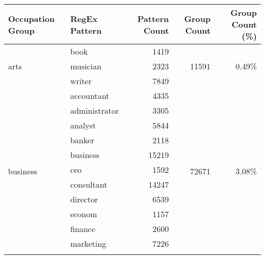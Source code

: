 \begin{table}[!htb]
\centering
\begin{tabular}{|l|l|r|r|r|}
\hline
Occupation Group                   & RegEx Pattern & Pattern Count   & Group Count            & Group Count (\%)       \\ \hline
\multirow{3}{*}{arts}      & book            & 1419    & \multirow{3}{*}{11591}  & \multirow{3}{*}{0.49\%}  \\ \cline{2-3}
                           & musician        & 2323    &                         &                          \\ \cline{2-3}
                           & writer          & 7849    &                         &                          \\ \hline
\multirow{12}{*}{business} & accountant      & 4335    & \multirow{12}{*}{72671} & \multirow{12}{*}{3.08\%} \\ \cline{2-3}
                           & administrator   & 3305    &                         &                          \\ \cline{2-3}
                           & analyst         & 5844    &                         &                          \\ \cline{2-3}
                           & banker          & 2118    &                         &                          \\ \cline{2-3}
                           & business        & 15219   &                         &                          \\ \cline{2-3}
                           & ceo             & 1592    &                         &                          \\ \cline{2-3}
                           & consultant      & 14247   &                         &                          \\ \cline{2-3}
                           & director        & 6539    &                         &                          \\ \cline{2-3}
                           & econom          & 1157    &                         &                          \\ \cline{2-3}
                           & finance         & 2600    &                         &                          \\ \cline{2-3}
                           & marketing       & 7226    &                         &                          \\ \cline{2-3}

\end{tabular}
\end{table}
